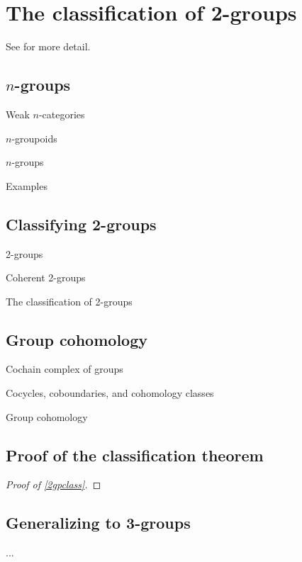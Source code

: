 \chapter{The classification of 2-groups}

See \cite{hda5} for more detail. 

\section{$n$-groups}

\begin{defn} Weak $n$-categories \end{defn}

\begin{defn} $n$-groupoids \end{defn}

\begin{defn} $n$-groups \end{defn}

\begin{example} Examples \end{example}

\section{Classifying 2-groups}

\begin{defn} 2-groups \end{defn}

\begin{defn} Coherent 2-groups \end{defn}

\begin{thm} \label{2gpclass} The classification of 2-groups \end{thm}

\section{Group cohomology}

\begin{defn} Cochain complex of groups \end{defn}

\begin{defn} Cocycles, coboundaries, and cohomology classes \end{defn}

\begin{defn} Group cohomology \end{defn}

\section{Proof of the classification theorem}

\begin{proof}[Proof of \cref{2gpclass}] \end{proof}

\section{Generalizing to 3-groups}

...